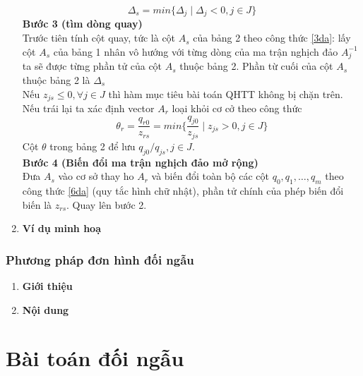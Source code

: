 \documentclass{article}
\begin{document}
\begin{enumerate}
                                    \begin{equation}
                                        \Delta_s = min\{\Delta_j \mid \Delta_j < 0,j \in J \}
                                    \end{equation}
                            \textbf{Bước 3 (tìm dòng quay)}\\
                                Trước tiên tính cột quay, tức là cột $A_s$ của bảng 2 theo công thức \eqref{3da}: lấy cột $A_s$ của bảng 1 nhân vô hướng với từng dòng của ma trận nghịch đảo $A_j^{-1}$ ta sẽ được từng phần tử của cột $A_s$ thuộc bảng 2. Phần từ cuối của cột $A_s$ thuộc bảng 2 là $\Delta_s$\\
                                Nếu $z_{js} \leq 0, \forall j \in J$ thì hàm mục tiêu bài toán QHTT không bị chặn trên. Nếu trái lại ta xác định vector $A_r$ loại khỏi cơ cở theo công thức
                                    \begin{equation}
                                        \theta_r=\frac{q_{r0}}{z_{rs}}=min\{ \frac{q_{j0}}{z_{js}} \mid z_{js} > 0,j \in J \}
                                    \end{equation}
                                Cột $\theta$ trong bảng 2 để lưu $q_{j0}/q_{js},j \in J$.\\
                            \textbf{Bước 4 (Biến đổi ma trận nghịch đảo mở rộng)}\\
                                Đưa $A_s$ vào cơ sở thay ho $A_r$ và biến đổi toàn bộ các cột $q_0,q_1,\ldots,q_m$ theo công thức \eqref{6da} (quy tắc hình chữ nhật), phần tử chính của phép biến đổi biến là $z_{rs}$. Quay lên bước 2. 
                    \item \textbf{Ví dụ minh hoạ} \\
                \end{enumerate}
            \subsubsection{Phương pháp đơn hình đối ngẫu}
                \begin{enumerate}
                    \item \textbf{Giới thiệu} \\
                    \item \textbf{Nội dung} \\
                \end{enumerate}

\section{Bài toán đối ngẫu}
\end{document}
